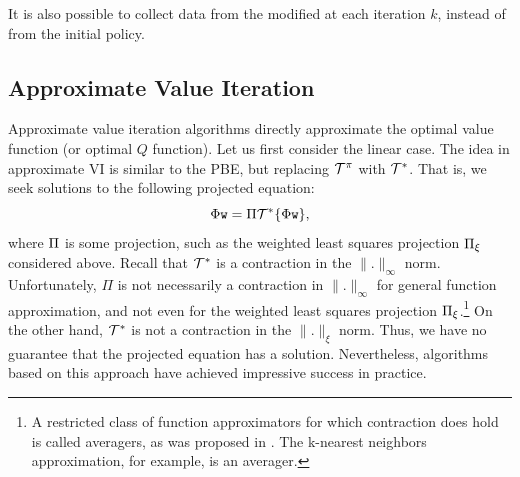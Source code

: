 
It is also possible to collect data from the modified at each iteration $k$, instead of from the initial policy.

\subsection{Approximate Value Iteration}
Approximate value iteration algorithms directly approximate the optimal value function (or optimal $Q$ function). Let us first consider the linear case. The idea in approximate VI is similar to the PBE, but replacing $\mathcal{T}^\pi$ with $\mathcal{T}^*$. That is, we seek solutions to the following projected equation:
\begin{equation*}
    \Phi {\tt w} = \Pi \mathcal{T}^* \{\Phi {\tt w}\},
\end{equation*}
where $\Pi$ is some projection, such as the weighted least squares projection $\Pi_\xi$ considered above. Recall that $\mathcal{T}^*$ is a contraction in the $\|.\|_\infty$ norm. Unfortunately, $\Pi$ is not necessarily a contraction in $\|.\|_\infty$ for general function approximation, and not even for the weighted least squares projection $\Pi_\xi$.\footnote{A restricted class of function approximators for which contraction does hold is called averagers, as was proposed in \cite{gordon1995stable}. The k-nearest neighbors approximation, for example, is an averager.} On the other hand, $\mathcal{T}^*$ is not a contraction in the $\|.\|_\xi$ norm. Thus, we have no guarantee that the projected equation has a solution. Nevertheless, algorithms based on this approach have achieved impressive success in practice. 

